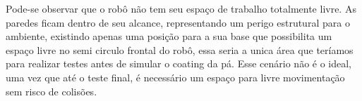 Pode-se observar que o robô não tem seu espaço de trabalho totalmente livre. As
paredes ficam dentro de seu alcance, representando um perigo estrutural
para o ambiente,  existindo apenas uma posição para a sua base que possibilita
um espaço livre no semi circulo frontal do robô, essa seria a unica área que teríamos para realizar testes 
antes de simular o coating da pá. Esse cenário não é o ideal, uma vez que até o teste final, 
é necessário um espaço para livre movimentação sem risco de colisões. 

